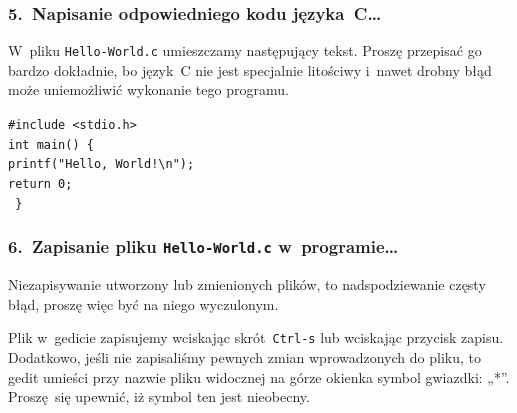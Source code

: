 \documentclass[10pt,t]{beamer}
\begin{document}
\begin{frame}
  \frametitle{5.~Napisanie odpowiedniego kodu języka~C\ldots}


  W~pliku \texttt{Hello-World.c} umieszczamy następujący tekst. Proszę
  przepisać go bardzo \alert{dokładnie}, bo język~C nie jest specjalnie
  litościwy i~nawet drobny błąd może uniemożliwić wykonanie tego programu.

  \vspace{2em}



  \texttt{\#include <stdio.h>} \\
  \vspace{0.8em}
  \texttt{int main() \{ } \\
  \hphantom{aaaa} \texttt{printf("Hello, World!\textbackslash n");} \\
  \vspace{0.8em}
  \vspace{0.8em}
  \vspace{0.8em}
  \vspace{0.8em}
  \hphantom{aaaa} \texttt{return 0;} \\
  \texttt{ \} }

\end{frame}





\begin{frame}
  \frametitle{6.~Zapisanie pliku \texttt{Hello-World.c}
    w~programie\ldots}


  Niezapisywanie utworzony lub zmienionych plików, to nadspodziewanie
  częsty błąd, proszę więc być na niego wyczulonym.

  Plik w~gedicie zapisujemy wciskając skrót~\texttt{Ctrl-s} lub wciskając
  przycisk zapisu. Dodatkowo, jeśli nie zapisaliśmy pewnych zmian
  wprowadzonych do pliku, to gedit umieści przy nazwie pliku widocznej na
  górze okienka symbol gwiazdki: „\hspace{0.1em}*”. Proszę~się upewnić, iż
  symbol ten jest nieobecny.

\end{frame}
\end{document}
